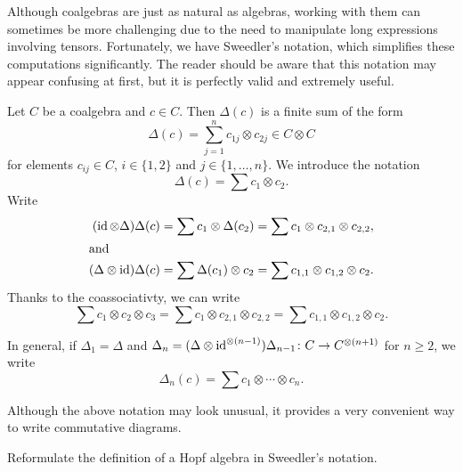 \documentclass[12pt]{amsproc}
\begin{document}
Although coalgebras are just as natural as algebras, working with them can sometimes be more challenging due to the need to manipulate long expressions involving tensors. Fortunately, we have Sweedler's notation, which simplifies these computations significantly. The reader should be aware that this notation may appear confusing at first, but it is perfectly valid and extremely useful.

Let $C$ be a coalgebra and $c\in C$. Then $\Delta(c)$ is
a finite sum of the form 
\[
\Delta(c)=\sum_{j=1}^n c_{1j}\otimes c_{2j}\in C\otimes C
\]
for elements $c_{ij}\in C$, $i\in\{1,2\}$ 
and $j\in\{1,\dots,n\}$. We introduce the notation 
\[
\Delta(c)=\sum c_{1}\otimes c_{2}.
\]
Write 
\begin{align*}
(\operatorname{id}\otimes\Delta)\Delta(c)&=\sum c_1\otimes\Delta(c_2)=\sum c_1\otimes c_{2,1}\otimes c_{2,2},\\
\shortintertext{and}
(\Delta\otimes\operatorname{id})\Delta(c)&=\sum\Delta(c_1)\otimes c_2
    =\sum c_{1,1}\otimes c_{1,2}\otimes c_{2}. 
\end{align*}
Thanks to the coassociativty, we can write 
\[
\sum c_{1}\otimes c_{2}\otimes c_{3}
=\sum c_1\otimes c_{2,1}\otimes c_{2,2}
=\sum c_{1,1}\otimes c_{1,2}\otimes c_{2}.
\]

In general, if $\Delta_1=\Delta$ and 
$\Delta_n=(\Delta\otimes\operatorname{id}^{\otimes(n-1)})\Delta_{n-1}\colon C\to C^{\otimes(n+1)}$ for $n\geq2$, 
we write 
\[
\Delta_n(c)=\sum c_{1}\otimes\cdots\otimes c_{n}.
\]

Although the above notation may look unusual, it provides a very convenient way to write commutative diagrams. 

\begin{exercise}
\label{xca:Hopf}
    Reformulate the definition of a Hopf algebra in Sweedler’s notation.
\end{exercise}
\end{document}
